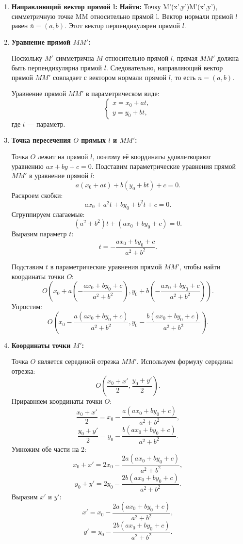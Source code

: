 \documentclass[a4paper,14pt]{extreport} %
\begin{document}
\begin{enumerate}
\item \textbf{Направляющий вектор прямой l:}
\textbf{Найти:} Точку M'(x',y')M'(x',y'), симметричную точке MM относительно прямой l.
Вектор нормали прямой \( l \) равен \( \overline{n} = (a, b) \). Этот вектор перпендикулярен прямой \( l \).

\item \textbf{Уравнение прямой \( MM' \):}

Поскольку \( M' \) симметрична \( M \) относительно прямой \( l \), прямая \( MM' \) должна быть перпендикулярна прямой \( l \). Следовательно, направляющий вектор прямой \( MM' \) совпадает с вектором нормали прямой \( l \), то есть \( \overline{n} = (a, b) \).

Уравнение прямой \( MM' \) в параметрическом виде:
\[
\begin{cases}
    x = x_0 + a t, \\
    y = y_0 + b t,
\end{cases}
\]
где \( t \) — параметр.

\item \textbf{Точка пересечения \( O \) прямых \( l \) и \( MM' \):}

Точка \( O \) лежит на прямой \( l \), поэтому её координаты удовлетворяют уравнению \( ax + by + c = 0 \). Подставим параметрические уравнения прямой \( MM' \) в уравнение прямой \( l \):
\[
a(x_0 + a t) + b(y_0 + b t) + c = 0.
\]
Раскроем скобки:
\[
a x_0 + a^2 t + b y_0 + b^2 t + c = 0.
\]
Сгруппируем слагаемые:
\[
(a^2 + b^2) t + (a x_0 + b y_0 + c) = 0.
\]
Выразим параметр \( t \):
\[
t = -\frac{a x_0 + b y_0 + c}{a^2 + b^2}.
\]

Подставим \( t \) в параметрические уравнения прямой \( MM' \), чтобы найти координаты точки \( O \):
\[
O\left(x_0 + a \left(-\frac{a x_0 + b y_0 + c}{a^2 + b^2}\right), y_0 + b \left(-\frac{a x_0 + b y_0 + c}{a^2 + b^2}\right)\right).
\]
Упростим:
\[
O\left(x_0 - \frac{a(a x_0 + b y_0 + c)}{a^2 + b^2}, y_0 - \frac{b(a x_0 + b y_0 + c)}{a^2 + b^2}\right).
\]

\item \textbf{Координаты точки \( M' \):}

Точка \( O \) является серединой отрезка \( MM' \). Используем формулу середины отрезка:
\[
O\left(\frac{x_0 + x'}{2}, \frac{y_0 + y'}{2}\right).
\]
Приравняем координаты точки \( O \):
\[
\frac{x_0 + x'}{2} = x_0 - \frac{a(a x_0 + b y_0 + c)}{a^2 + b^2},
\]
\[
\frac{y_0 + y'}{2} = y_0 - \frac{b(a x_0 + b y_0 + c)}{a^2 + b^2}.
\]
Умножим обе части на 2:
\[
x_0 + x' = 2x_0 - \frac{2a(a x_0 + b y_0 + c)}{a^2 + b^2},
\]
\[
y_0 + y' = 2y_0 - \frac{2b(a x_0 + b y_0 + c)}{a^2 + b^2}.
\]
Выразим \( x' \) и \( y' \):
\[
x' = x_0 - \frac{2a(a x_0 + b y_0 + c)}{a^2 + b^2},
\]
\[
y' = y_0 - \frac{2b(a x_0 + b y_0 + c)}{a^2 + b^2}.
\] 
\end{enumerate}
\end{document}
